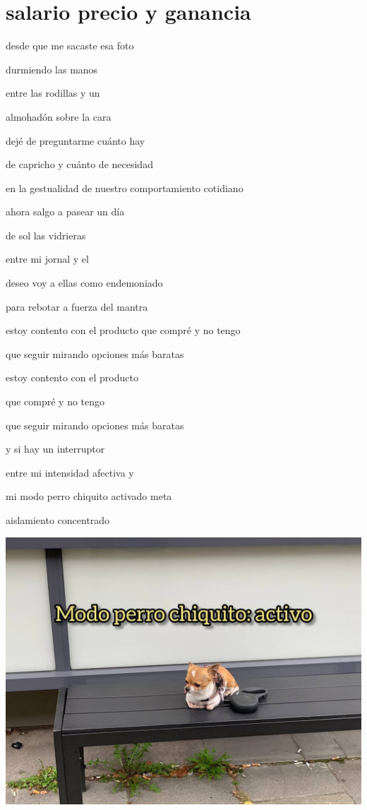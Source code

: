\documentclass[
]{book}
\begin{document}
\hypertarget{salario-precio-y-ganancia}{%
\chapter{salario precio y ganancia}\label{salario-precio-y-ganancia}}

desde que me sacaste esa foto

durmiendo las manos

entre las rodillas y un

almohadón sobre la cara

dejé de preguntarme cuánto hay

de capricho y cuánto de necesidad

en la gestualidad de nuestro comportamiento cotidiano

ahora salgo a pasear un día

de sol las vidrieras

entre mi jornal y el

deseo voy a ellas como endemoniado

para rebotar a fuerza del mantra

estoy contento con el producto que compré y no tengo

que seguir mirando opciones más baratas

estoy contento con el producto

que compré y no tengo

que seguir mirando opciones más baratas

y si hay un interruptor

entre mi intensidad afectiva y

mi modo perro chiquito activado meta

aislamiento concentrado

\includegraphics{images/6.png}
\end{document}
